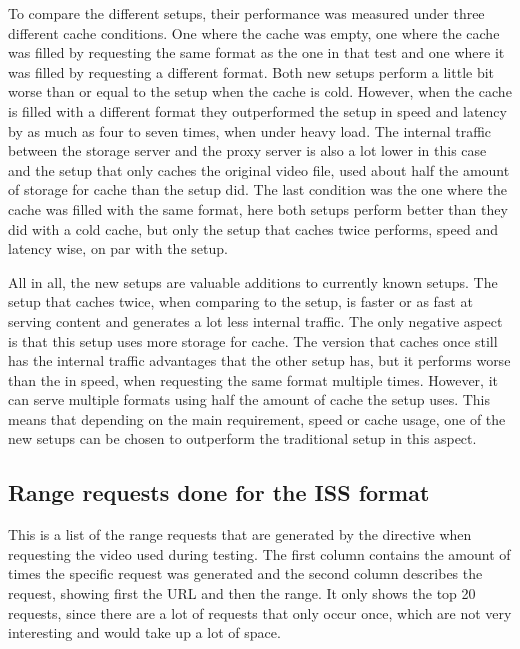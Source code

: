 \documentclass[twoside,openright]{uva-bachelor-thesis}
\begin{document}
To compare the different setups, their performance was measured under three
different cache conditions. One where the cache was empty, one where the cache
was filled by requesting the same format as the one in that test and one where
it was filled by requesting a different format. Both new setups perform a little
bit worse than or equal to the \cdn setup when the cache is cold.  However, when
the cache is filled with a different format they outperformed the \cdn setup in
speed and latency by as much as four to seven times, when under heavy load. The
internal traffic between the storage server and the proxy server is also a lot
lower in this case and the setup that only caches the original video file, used
about half the amount of storage for cache than the \cdn setup did. The last
condition was the one where the cache was filled with the same format, here both
setups perform better than they did with a cold cache, but only the setup that
caches twice performs, speed and latency wise, on par with the \cdn setup.

All in all, the new setups are valuable additions to currently known setups. The
setup that caches twice, when comparing to the \cdn setup, is faster or as
fast at serving content and generates a lot less internal traffic. The only
negative aspect is that this setup uses more storage for cache. The version that
caches once still has the internal traffic advantages that the other setup has,
but it performs worse than the \cdn in speed, when requesting the same format
multiple times. However, it can serve multiple formats using half the amount of
cache the \cdn setup uses. This means that depending on the main requirement,
speed or cache usage, one of the new setups can be chosen to outperform the
traditional \cdn setup in this aspect.






\printbibliography[heading=bibintoc]{}

\printglossaries{}
\begin{appendices}
    \chapter{Range requests done for the ISS format}\label{ap:log}
    This is a list of the range requests that are generated by the \ipplong
    directive when requesting the video used during testing. The first column
    contains the amount of times the specific request was generated and the
    second column describes the request, showing first the URL and then the
    range. It only shows the top 20 requests, since there are a lot of requests
    that only occur once, which are not very interesting and would take up a lot
    of space.
\end{appendices}
\end{document}
